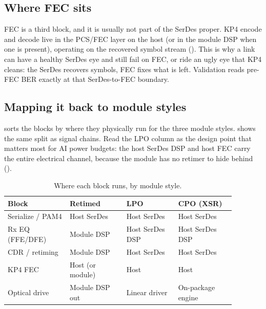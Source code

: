\subsection{Where FEC sits}

FEC is a third block, and it is usually not part of the SerDes proper. KP4 encode
and decode live in the PCS/FEC layer on the host (or in the module DSP when one is
present), operating on the recovered symbol stream (). This is why a
link can have a healthy SerDes eye and still fail on FEC, or ride an ugly eye that
KP4 cleans: the SerDes recovers symbols, FEC fixes what is left. Validation reads
pre-FEC BER exactly at that SerDes-to-FEC boundary.

\subsection{Mapping it back to module styles}

 sorts the blocks by where they physically run for the three
module styles.  shows the same split as signal chains. Read the
LPO column as the design point that matters most for AI power budgets: the host
SerDes DSP and host FEC carry the entire electrical channel, because the module has
no retimer to hide behind ().

\begin{table}[ht]
\centering
\caption{Where each block runs, by module style.\label{tab:serdes-dsp}}
\setlength{\tabcolsep}{4pt}%
\footnotesize
\renewcommand{\arraystretch}{1.25}%
\begin{tabular}{@{}p{0.24\linewidth}p{0.22\linewidth}p{0.20\linewidth}p{0.22\linewidth}@{}}
\toprule
Block & Retimed & LPO & CPO (XSR) \\
\midrule
Serialize / PAM4 & Host SerDes & Host SerDes & Host SerDes \\
\addlinespace[1.5em]
Rx EQ (FFE/DFE) & Module DSP & Host SerDes DSP & Host SerDes DSP \\
\addlinespace[1.5em]
CDR / retiming & Module DSP & Host SerDes & Host SerDes \\
\addlinespace[1.5em]
KP4 FEC & Host (or module) & Host & Host \\
\addlinespace[1.5em]
Optical drive & Module DSP out & Linear driver & On-package engine \\
\bottomrule
\end{tabular}
\end{table}


